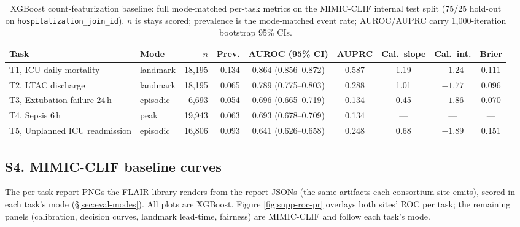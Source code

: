 \begin{table}[h]
\centering
\footnotesize
\setlength{\tabcolsep}{4pt}
\caption{XGBoost count-featurization baseline: full mode-matched
per-task metrics on the MIMIC-CLIF internal test split (75/25 hold-out
on \texttt{hospitalization\_join\_id}). $n$ is stays scored; prevalence
is the mode-matched event rate; AUROC/AUPRC carry 1{,}000-iteration
bootstrap 95\% CIs.}
\label{tab:supp-baseline-full}
\begin{tabular}{l l rr cc ccc}
\toprule
Task & Mode & $n$ & Prev. & AUROC (95\% CI) & AUPRC & Cal.\ slope & Cal.\ int. & Brier \\
\midrule
T1, ICU daily mortality       & landmark & 18{,}195 & 0.134  & 0.864 (0.856--0.872) & 0.587 & 1.19 & $-1.24$ & 0.111 \\
T2, LTAC discharge            & landmark & 18{,}195 & 0.065  & 0.789 (0.775--0.803) & 0.288 & 1.01 & $-1.77$ & 0.096 \\
T3, Extubation failure 24\,h  & episodic & 6{,}693  & 0.054  & 0.696 (0.665--0.719) & 0.134 & 0.45 & $-1.86$ & 0.070 \\
T4, Sepsis 6\,h               & peak     & 19{,}943 & 0.063  & 0.693 (0.678--0.709) & 0.134 & --- & --- & --- \\
T5, Unplanned ICU readmission & episodic & 16{,}806 & 0.093  & 0.641 (0.626--0.658) & 0.248 & 0.68 & $-1.89$ & 0.151 \\
\bottomrule
\end{tabular}
\end{table}

\clearpage
\subsection*{S4. MIMIC-CLIF baseline curves}

The per-task report PNGs the FLAIR library renders from the report
JSONs (the same artifacts each consortium site emits), scored in each
task's mode (\S\ref{sec:eval-modes}). All plots are XGBoost. Figure
\ref{fig:supp-roc-pr} overlays both sites' ROC per task; the remaining
panels (calibration, decision curves, landmark lead-time, fairness) are
MIMIC-CLIF and follow each task's mode.

